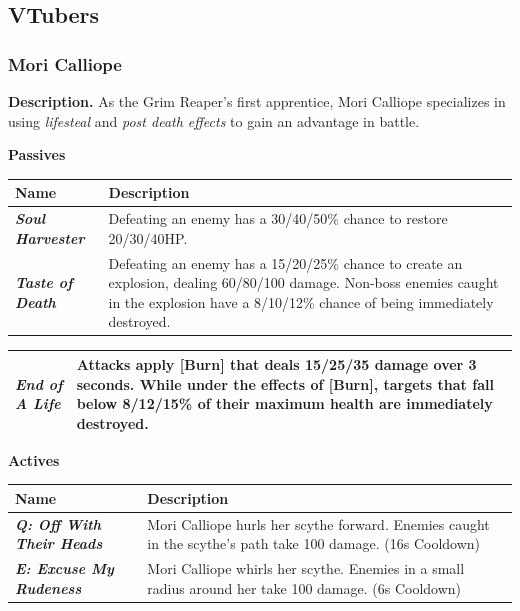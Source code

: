 \documentclass[10pt, a4paper]{article}
\begin{document}
\begin{multicols}{2}
	\subsection{VTubers} \label{VTubers}
  	
  	\subsubsection{Mori Calliope}
  	
  	\textbf{Description.} As the Grim Reaper's first apprentice, Mori Calliope specializes in using \textit{lifesteal} and \textit{post death effects} to gain an advantage in battle.

	\textbf{Passives}
	
	\begin{center}
		\begin{tabular}{|p{2.7cm}|p{5.5cm}|}
			\hline
			\textbf{Name} & \textbf{Description} \\
			\hline
			\textit{\textbf{Soul Harvester}} & Defeating an enemy has a 30/40/50\% chance to restore 20/30/40HP. \\
			\textit{\textbf{Taste of Death}} & Defeating an enemy has a 15/20/25\% chance to create an explosion, dealing 60/80/100 damage. Non-boss enemies caught in the explosion have a 8/10/12\% chance of being immediately destroyed. \\
		
		\end{tabular}
	\end{center}
	
	\begin{center}
		\begin{tabular}{|p{2.7cm}|p{5.5cm}|}
				\textit{\textbf{End of A Life}}  & Attacks apply [Burn] that deals 15/25/35 damage over 3 seconds. While under the effects of [Burn], targets that fall below 8/12/15\% of their maximum health are immediately destroyed. \\
			\hline
			
		\end{tabular}
	\end{center}
	
	\begin{center}
		\textbf{Actives}
	\end{center}
	
	\begin{center}
		\begin{tabular}{|p{2.7cm}|p{5.5cm}|}
			\hline
			\textbf{Name} & \textbf{Description} \\
			\hline
			\textit{\textbf{Q: Off With Their Heads}} & Mori Calliope hurls her scythe forward. Enemies caught in the scythe's path take 100 damage. (16s Cooldown)\\
			\textit{\textbf{E: Excuse My Rudeness}} & Mori Calliope whirls her scythe. Enemies in a small radius around her take 100 damage. (6s Cooldown) \\
			\hline
		\end{tabular}
	\end{center}
  	

\end{multicols}
\end{document}
